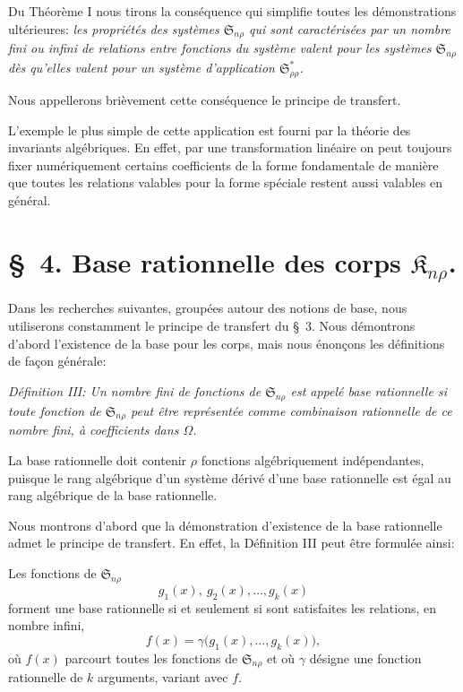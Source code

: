 \documentclass[11pt]{article}
\providecommand{\Kfield}{\mathfrak{K}}
\providecommand{\Ssys}{\mathfrak{S}}
\begin{document}
Du Théorème I nous tirons la conséquence qui simplifie toutes les démonstrations ultérieures: \emph{les propriétés des systèmes $\Ssys_{n\rho}$ qui sont caractérisées par un nombre fini ou infini de relations entre fonctions du système valent pour les systèmes $\Ssys_{n\rho}$ dès qu'elles valent pour un système d'application $\Ssys^*_{\rho\rho}$.}

Nous appellerons brièvement cette conséquence le \og{}principe de transfert\fg{}.

L'exemple le plus simple de cette application est fourni par la théorie des invariants algébriques. En effet, par une transformation linéaire on peut toujours fixer numériquement certains coefficients de la forme fondamentale de manière que toutes les relations valables pour la forme spéciale restent aussi valables en général.

\section*{\S\ 4. Base rationnelle des corps $\Kfield_{n\rho}$.}

Dans les recherches suivantes, groupées autour des notions de base, nous utiliserons constamment le \og{}principe de transfert\fg{} du \S\ 3. Nous démontrons d'abord l'existence de la base pour les corps, mais nous énonçons les définitions de façon générale:

\emph{Définition III: Un nombre fini de fonctions de $\Ssys_{n\rho}$ est appelé base rationnelle si toute fonction de $\Ssys_{n\rho}$ peut être représentée comme combinaison rationnelle de ce nombre fini, à coefficients dans $\Omega$.}

La base rationnelle doit contenir $\rho$ fonctions algébriquement indépendantes, puisque le rang algébrique d'un système dérivé d'une base rationnelle est égal au rang algébrique de la base rationnelle.

Nous montrons d'abord que la démonstration d'existence de la base rationnelle admet le principe de transfert. En effet, la Définition III peut être formulée ainsi:

Les fonctions de $\Ssys_{n\rho}$
\[
  g_1(x),\ g_2(x),\ldots, g_k(x)
\]
forment une base rationnelle si et seulement si sont satisfaites les relations, en nombre infini,
\begin{equation}
  f(x)=\gamma\bigl(g_1(x),\ldots,g_k(x)\bigr),
\tag{1}
\end{equation}
où $f(x)$ parcourt toutes les fonctions de $\Ssys_{n\rho}$ et où $\gamma$ désigne une fonction rationnelle de $k$ arguments, variant avec $f$.
\end{document}
